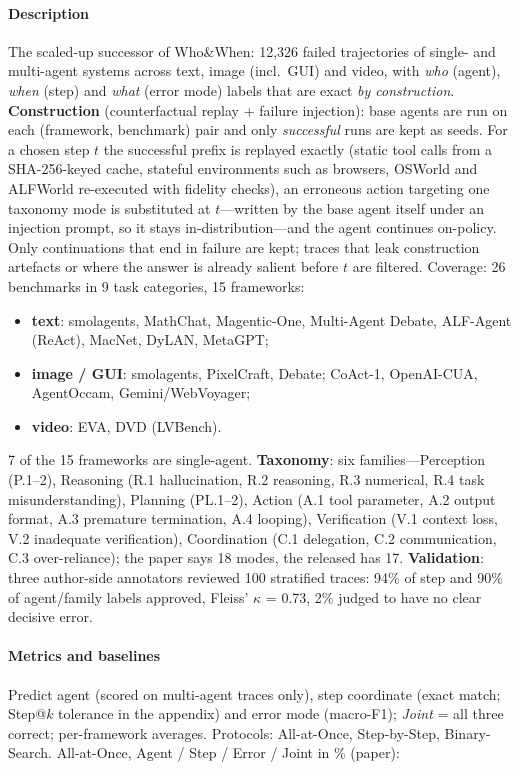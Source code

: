 \paragraph{Description} The scaled-up successor of Who\&When: 12,326 failed trajectories of single- and multi-agent systems across text, image (incl.\ GUI) and video, with \emph{who} (agent), \emph{when} (step) and \emph{what} (error mode) labels that are exact \emph{by construction}. \textbf{Construction} (counterfactual replay + failure injection): base agents are run on each (framework, benchmark) pair and only \emph{successful} runs are kept as seeds. For a chosen step $t$ the successful prefix is replayed exactly (static tool calls from a SHA-256-keyed cache, stateful environments such as browsers, OSWorld and ALFWorld re-executed with fidelity checks), an erroneous action targeting one taxonomy mode is substituted at $t$---written by the base agent itself under an injection prompt, so it stays in-distribution---and the agent continues on-policy. Only continuations that end in failure are kept; traces that leak construction artefacts or where the answer is already salient before $t$ are filtered. Coverage: 26 benchmarks in 9 task categories, 15 frameworks:
\begin{itemize}
\item \textbf{text}: smolagents, MathChat, Magentic-One, Multi-Agent Debate, ALF-Agent (ReAct), MacNet, DyLAN, MetaGPT;
\item \textbf{image / GUI}: smolagents, PixelCraft, Debate; CoAct-1, OpenAI-CUA, AgentOccam, Gemini/WebVoyager;
\item \textbf{video}: EVA, DVD (LVBench).
\end{itemize}
7 of the 15 frameworks are single-agent. \textbf{Taxonomy}: six families---Perception (P.1--2), Reasoning (R.1 hallucination, R.2 reasoning, R.3 numerical, R.4 task misunderstanding), Planning (PL.1--2), Action (A.1 tool parameter, A.2 output format, A.3 premature termination, A.4 looping), Verification (V.1 context loss, V.2 inadequate verification), Coordination (C.1 delegation, C.2 communication, C.3 over-reliance); the paper says 18 modes, the released  has 17. \textbf{Validation}: three author-side annotators reviewed 100 stratified traces: 94\% of step and 90\% of agent/family labels approved, Fleiss' $\kappa$ = 0.73, 2\% judged to have no clear decisive error.

\paragraph{Metrics and baselines} Predict agent (scored on multi-agent traces only), step coordinate (exact match; Step@$k$ tolerance in the appendix) and error mode (macro-F1); \emph{Joint} = all three correct; per-framework averages. Protocols: All-at-Once, Step-by-Step, Binary-Search. All-at-Once, Agent / Step / Error / Joint in \% (paper):

